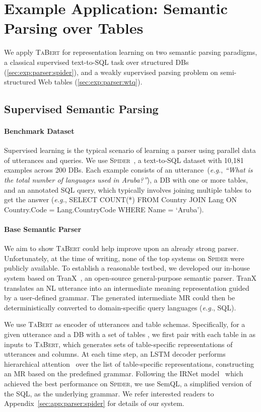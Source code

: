 \documentclass[11pt,a4paper]{article}
\def\model/{\textsc{TaBert}}
\renewcommand{\tt}[1]{\fontfamily{cmtt}\selectfont #1}
\newcommand{\eg}{\hbox{\emph{e.g.}}\xspace}
\def\spider/{\textsc{Spider}}
\begin{document}
\section{Example Application: Semantic Parsing over Tables}
\label{sec:task}


We apply \model/ for representation learning on two semantic parsing paradigms, a classical supervised text-to-SQL task over structured DBs (\autoref{sec:exp:parser:spider}), and a weakly supervised parsing problem on semi-structured Web tables (\autoref{sec:exp:parser:wtq}).

\subsection{Supervised Semantic Parsing}
\label{sec:exp:parser:spider}

\paragraph{Benchmark Dataset}
Supervised learning is the typical scenario of learning a parser using parallel data of utterances and  queries.
We use \spider/~\cite{Yu2018SpiderAL}, a text-to-SQL dataset with 10,181 examples across 200 DBs.
Each example consists of an utterance~(\eg, \textit{``What is the total number of languages used in Aruba?''}), a DB with one or more tables, and an annotated SQL query, which typically involves joining multiple tables to get the answer (\eg, {\tt SELECT COUNT(*) FROM Country JOIN Lang ON Country.Code = Lang.CountryCode WHERE Name = `Aruba'}).

\paragraph{Base Semantic Parser}
We aim to show \model/ could help improve upon an already strong parser.
Unfortunately, at the time of writing, none of the top systems on \spider/ were publicly available.
To establish a reasonable testbed, we developed our in-house system based on TranX~\cite{yin18tranx}, an open-source general-purpose semantic parser.
TranX translates an NL utterance into an intermediate meaning representation guided by a user-defined grammar.
The generated intermediate MR could then be deterministically converted to domain-specific query languages (\eg, SQL). 

We use \model/ as encoder of utterances and table schemas.
Specifically, for a given utterance  and a DB with a set of tables , we first pair  with each table  in  as inputs to \model/, which generates  sets of table-specific representations of utterances and columns.
At each time step, an LSTM decoder performs hierarchical
attention~\cite{Libovick2017AttentionSF} over the list of table-specific representations, constructing an MR based on the predefined grammar.
Following the IRNet model~\cite{Guo2019TowardsCT} which achieved the best performance on \spider/, we use SemQL, a simplified version of the SQL, as the underlying grammar. 
We refer interested readers to Appendix~\autoref{sec:app:parser:spider} for details of our system. 
\end{document}
